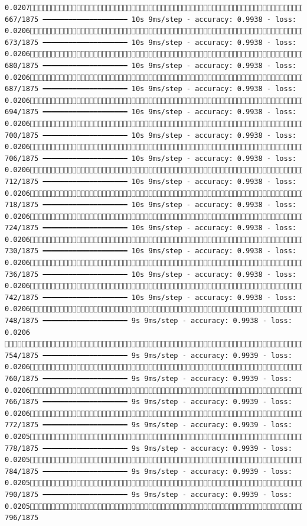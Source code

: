 \documentclass[
  letterpaper,
  DIV=11,
  numbers=noendperiod]{scrreprt}
\begin{document}
\begin{verbatim}
0.0207 667/1875 ━━━━━━━━━━━━━━━━━━━━ 10s 9ms/step - accuracy: 0.9938 - loss: 0.0206 673/1875 ━━━━━━━━━━━━━━━━━━━━ 10s 9ms/step - accuracy: 0.9938 - loss: 0.0206 680/1875 ━━━━━━━━━━━━━━━━━━━━ 10s 9ms/step - accuracy: 0.9938 - loss: 0.0206 687/1875 ━━━━━━━━━━━━━━━━━━━━ 10s 9ms/step - accuracy: 0.9938 - loss: 0.0206 694/1875 ━━━━━━━━━━━━━━━━━━━━ 10s 9ms/step - accuracy: 0.9938 - loss: 0.0206 700/1875 ━━━━━━━━━━━━━━━━━━━━ 10s 9ms/step - accuracy: 0.9938 - loss: 0.0206 706/1875 ━━━━━━━━━━━━━━━━━━━━ 10s 9ms/step - accuracy: 0.9938 - loss: 0.0206 712/1875 ━━━━━━━━━━━━━━━━━━━━ 10s 9ms/step - accuracy: 0.9938 - loss: 0.0206 718/1875 ━━━━━━━━━━━━━━━━━━━━ 10s 9ms/step - accuracy: 0.9938 - loss: 0.0206 724/1875 ━━━━━━━━━━━━━━━━━━━━ 10s 9ms/step - accuracy: 0.9938 - loss: 0.0206 730/1875 ━━━━━━━━━━━━━━━━━━━━ 10s 9ms/step - accuracy: 0.9938 - loss: 0.0206 736/1875 ━━━━━━━━━━━━━━━━━━━━ 10s 9ms/step - accuracy: 0.9938 - loss: 0.0206 742/1875 ━━━━━━━━━━━━━━━━━━━━ 10s 9ms/step - accuracy: 0.9938 - loss: 0.0206 748/1875 ━━━━━━━━━━━━━━━━━━━━ 9s 9ms/step - accuracy: 0.9938 - loss: 0.0206  754/1875 ━━━━━━━━━━━━━━━━━━━━ 9s 9ms/step - accuracy: 0.9939 - loss: 0.0206 760/1875 ━━━━━━━━━━━━━━━━━━━━ 9s 9ms/step - accuracy: 0.9939 - loss: 0.0206 766/1875 ━━━━━━━━━━━━━━━━━━━━ 9s 9ms/step - accuracy: 0.9939 - loss: 0.0206 772/1875 ━━━━━━━━━━━━━━━━━━━━ 9s 9ms/step - accuracy: 0.9939 - loss: 0.0205 778/1875 ━━━━━━━━━━━━━━━━━━━━ 9s 9ms/step - accuracy: 0.9939 - loss: 0.0205 784/1875 ━━━━━━━━━━━━━━━━━━━━ 9s 9ms/step - accuracy: 0.9939 - loss: 0.0205 790/1875 ━━━━━━━━━━━━━━━━━━━━ 9s 9ms/step - accuracy: 0.9939 - loss: 0.0205 796/1875 
\end{verbatim}
\end{document}
